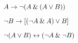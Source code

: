 \begin{earg}
\item $A \rightarrow {\neg}(A \mathbin{\&} (A \vee B)) $	\vspace{.5ex}	

%
%
%

\item ${\neg} B \rightarrow [({\neg} A \mathbin{\&} A) \vee B]$\vspace{.5ex} 

%

\item ${\neg}(A \vee B) \leftrightarrow ({\neg} A \mathbin{\&} {\neg} B)$ \vspace{.5ex}

%


\end{earg}
